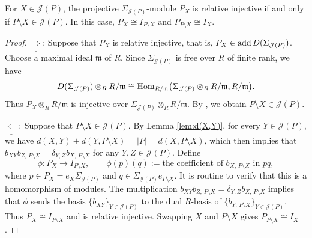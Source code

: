 \documentclass[a4paper,leqno]{amsart}
\begin{document}
\begin{lem}
\label{lem:projective-relative-injective}
For $X\in\mathcal J(P)$, the projective $\Sigma_{\mathcal J(P)}$-module $P_X$ is relative injective if and only if $P\setminus X\in\mathcal J(P)$. In this case, $P_X\cong I_{P\setminus X}$ and $P_{P\setminus X}\cong I_X$.
\end{lem}

\begin{proof}
$\underline{\Rightarrow}$: Suppose that $P_X$ is relative injective, that is, $P_X\in\operatorname{add} D(\Sigma_{\mathcal J(P)})$. Choose a maximal ideal $\mathfrak m$ of $R$. Since $\Sigma_{\mathcal J(P)}$ is free over $R$ of finite rank, we have
\[
D(\Sigma_{\mathcal J(P)})\otimes_R R/\mathfrak m
\cong
\operatorname{Hom}_{R/\mathfrak m}
\bigl(\Sigma_{\mathcal J(P)}\otimes_R R/\mathfrak m,
R/\mathfrak m\bigr).
\]
Thus $P_X\otimes_R R/\mathfrak m$ is injective over $\Sigma_{\mathcal J(P)}\otimes_R R/\mathfrak m$. By \cite[Lemma~6.3 and Corollary~7.24(2)]{CX26}, we obtain $P\setminus X\in\mathcal J(P)$.

$\underline{\Leftarrow}:$ Suppose that $P\setminus X\in\mathcal J(P)$. By Lemma \ref{lem:d(X,Y)}, for every $Y\in\mathcal J(P)$, we have $d(X,Y)+d(Y,P\setminus X)=|P|=d(X,P\setminus X)$, which then implies that $b_{XY}b_{Z,\,P\setminus X}=\delta_{Y,Z}b_{X,\,P\setminus X}$ for any $Y,Z\in\mathcal J(P)$. Define
\[
\phi:P_X\longrightarrow I_{P\setminus X},
\qquad
\phi(p)(q):=
\text{the coefficient of $b_{X,\,P\setminus X}$ in $pq$},
\]
where $p\in P_X=e_X\Sigma_{\mathcal{J}(P)}$ and $q\in\Sigma_{\mathcal J(P)}e_{P\setminus X}$. It is routine to verify that this is a homomorphism of modules. The multiplication  $b_{XY}b_{Z,\,P\setminus X}=\delta_{Y,Z}b_{X,\,P\setminus X}$ implies that $\phi$ sends the basis $\{b_{XY}\}_{Y\in\mathcal J(P)}$ to the dual $R$-basis of $\{b_{Y,\,P\setminus X}\}_{Y\in\mathcal J(P)}$. Thus $P_X\cong I_{P\setminus X}$ and is relative injective. Swapping $X$ and $P\setminus X$ gives $P_{P\setminus X}\cong I_X$.
\end{proof}
\end{document}
